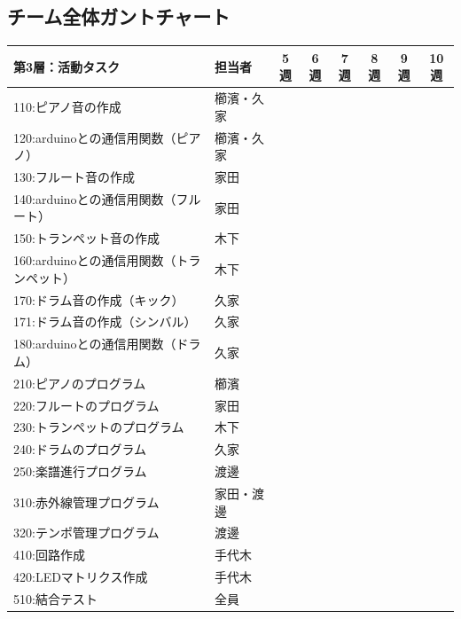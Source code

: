 \documentclass[a4paper,11pt]{ltjsarticle}
\providecommand{\％}{\%}
\begin{document}
\renewcommand{\arraystretch}{1.3}

\begingroup
\setlength{\tabcolsep}{3pt}

\subsection{チーム全体ガントチャート}\label{sec:gantt-team}

\begin{longtable}{|p{6.2cm}|p{2.3cm}|c|c|c|c|c|c|}
\hline
\rowcolor[gray]{0.9}
第3層：活動タスク & 担当者 & 5週 & 6週 & 7週 & 8週 & 9週 & 10週 \\
\hline
110:ピアノ音の作成 & 櫛濱・久家 & \cellcolor{ganttCell} & & \cellcolor{ganttCell} & & & \\
\hline
120:arduinoとの通信用関数（ピアノ） & 櫛濱・久家 & \cellcolor{ganttCell} & & & & & \\
\hline
130:フルート音の作成 & 家田 & \cellcolor{ganttCell} & & & & & \\
\hline
140:arduinoとの通信用関数（フルート） & 家田 & \cellcolor{ganttCell} & & & & & \\
\hline
150:トランペット音の作成 & 木下 & \cellcolor{ganttCell} & & & & & \\
\hline
160:arduinoとの通信用関数（トランペット） & 木下 & \cellcolor{ganttCell} & & & & & \\
\hline
170:ドラム音の作成（キック） & 久家 & & \cellcolor{ganttCell} & & & & \\
\hline
171:ドラム音の作成（シンバル） & 久家 & & \cellcolor{ganttCell} & & & & \\
\hline
180:arduinoとの通信用関数（ドラム） & 久家 & & \cellcolor{ganttCell} & & & & \\
\hline
210:ピアノのプログラム & 櫛濱 & \cellcolor{ganttCell} & & & & & \\
\hline
220:フルートのプログラム & 家田 & \cellcolor{ganttCell} & & & & & \\
\hline
230:トランペットのプログラム & 木下 & \cellcolor{ganttCell} & & & & & \\
\hline
240:ドラムのプログラム & 久家 & & \cellcolor{ganttCell} & & & & \\
\hline
250:楽譜進行プログラム & 渡邊 & & \cellcolor{ganttCell} & \cellcolor{ganttCell} & \cellcolor{ganttCell} & & \\
\hline
310:赤外線管理プログラム & 家田・渡邊 & & \cellcolor{ganttCell} & \cellcolor{ganttCell} & \cellcolor{ganttCell} & & \\
\hline
320:テンポ管理プログラム & 渡邊 & & \cellcolor{ganttCell} & & & & \\
\hline
410:回路作成 & 手代木 & & \cellcolor{ganttCell} & & & & \\
\hline
420:LEDマトリクス作成 & 手代木 & & \cellcolor{ganttCell} & \cellcolor{ganttCell} & \cellcolor{ganttCell} & & \\
\hline
510:結合テスト & 全員 & & & & \cellcolor{ganttCell} & \cellcolor{ganttCell} & \cellcolor{ganttCell} \\
\hline
\end{longtable}
\end{document}
